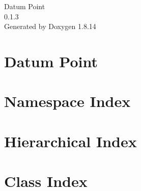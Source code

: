 \documentclass[twoside]{book}
\newcommand{\+}{\discretionary{\mbox{\scriptsize$\hookleftarrow$}}{}{}}
\newcommand{\clearemptydoublepage}{%
  \newpage{\pagestyle{empty}\cleardoublepage}%
}
\begin{document}
\hypersetup{pageanchor=false,
             bookmarksnumbered=true,
             pdfencoding=unicode
            }
\begin{titlepage}
\vspace*{7cm}
\begin{center}%
{\Large Datum Point \\[1ex]\large 0.\+1.\+3 }\\
\vspace*{1cm}
{\large Generated by Doxygen 1.8.14}\\
\end{center}
\end{titlepage}
\clearemptydoublepage
{}
\tableofcontents
\clearemptydoublepage
{}
\hypersetup{pageanchor=true}

\chapter{Datum Point}
\label{md__d_1__work__git_hub_datum-point__r_e_a_d_m_e}

\chapter{Namespace Index}

\chapter{Hierarchical Index}

\chapter{Class Index}

\end{document}
